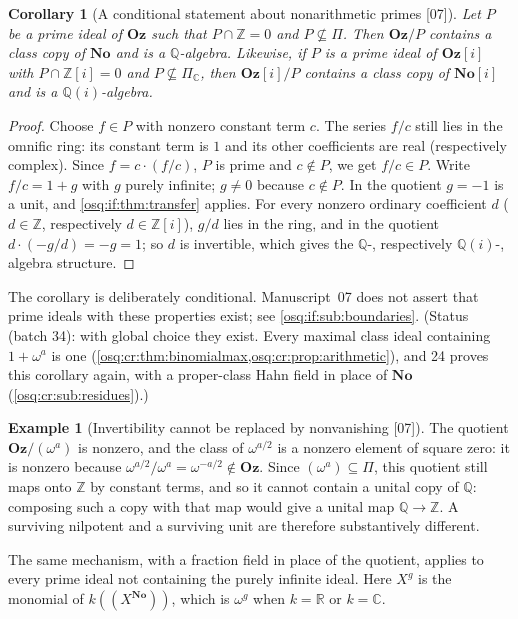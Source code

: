 \documentclass[11pt,letterpaper]{article}
\numberwithin{equation}{section}
\newtheorem{corollary}[corollary]{Corollary}
\theoremstyle{definition}
\newtheorem{example}[example]{Example}
\theoremstyle{remark}
\theoremstyle{plain}
\newcommand{\No}{\mathbf{No}}
\newcommand{\Oz}{\mathbf{Oz}}
\newcommand{\SC}{\No[i]}
\newcommand{\GOz}{\Oz[i]}
\newcommand{\Z}{\mathbb Z}
\newcommand{\Q}{\mathbb Q}
\newcommand{\R}{\mathbb R}
\newcommand{\C}{\mathbb C}
\newcommand{\hahn}[2]{#1(\!(X^{#2})\!)}
\newcommand{\src}[1]{\textup{\textsf{[#1]}}}
\begin{document}
\begin{corollary}[A conditional statement about nonarithmetic primes \src{07}]
\label{osq:if:cor:primefield}
Let $P$ be a prime ideal of $\Oz$ such that $P\cap\Z=0$ and $P\not\subseteq\Pi$. Then
$\Oz/P$ contains a class copy of $\No$ and is a $\Q$-algebra. Likewise, if $P$ is a prime
ideal of $\GOz$ with $P\cap\Z[i]=0$ and $P\not\subseteq\Pi_\C$, then $\GOz/P$ contains a class
copy of $\SC$ and is a $\Q(i)$-algebra.
\end{corollary}

\begin{proof}
Choose $f\in P$ with nonzero constant term $c$. The series $f/c$ still lies in the omnific
ring: its constant term is $1$ and its other coefficients are real (respectively complex).
Since $f=c\cdot(f/c)$, $P$ is prime and $c\notin P$, we get $f/c\in P$. Write $f/c=1+g$
with $g$ purely infinite; $g\ne0$ because $c\notin P$. In the quotient $g=-1$ is a unit, and
\cref{osq:if:thm:transfer} applies. For every nonzero ordinary coefficient $d$ ($d\in\Z$,
respectively $d\in\Z[i]$), $g/d$ lies in the ring, and in the quotient
$d\cdot(-g/d)=-g=1$; so $d$ is invertible, which gives the $\Q$-, respectively
$\Q(i)$-, algebra structure.
\end{proof}

The corollary is deliberately conditional. Manuscript~07 does not assert that prime ideals
with these properties exist; see \cref{osq:if:sub:boundaries}. (Status (batch 34): with global choice they exist. Every maximal class ideal
containing $1+\omega^a$ is one (\cref{osq:cr:thm:binomialmax,osq:cr:prop:arithmetic}), and 24 proves this corollary again, with a proper-class
Hahn field in place of $\No$ (\cref{osq:cr:sub:residues}).)

\begin{example}[Invertibility cannot be replaced by nonvanishing \src{07}]
\label{osq:if:ex:nilpotent}
The quotient $\Oz/(\omega^a)$ is nonzero, and the class of $\omega^{a/2}$ is a nonzero
element of square zero: it is nonzero because $\omega^{a/2}/\omega^a=\omega^{-a/2}\notin\Oz$.
Since $(\omega^a)\subseteq\Pi$, this quotient still maps onto $\Z$ by constant terms, and so
it cannot contain a unital copy of $\Q$: composing such a copy with that map would give a
unital map $\Q\to\Z$. A surviving nilpotent and a surviving unit are therefore
substantively different.
\end{example}

The same mechanism, with a fraction field in place of the quotient, applies to every prime
ideal not containing the purely infinite ideal. Here $X^g$ is the monomial of
$\hahn{k}{\No}$, which is $\omega^g$ when $k=\R$ or $k=\C$.
\end{document}
